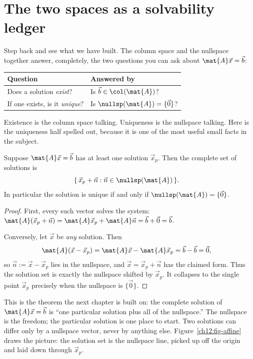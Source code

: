 \section{The two spaces as a solvability ledger}

Step back and see what we have built. The column space and the nullspace
together answer, completely, the two questions you can ask about
$\mat{A}\vec{x}=\vec{b}$:

\begin{center}
\begin{tabular}{ll}
\toprule
\textbf{Question} & \textbf{Answered by} \\
\midrule
Does a solution \emph{exist}? & Is $\vec{b}\in\col(\mat{A})$? \\
If one exists, is it \emph{unique}? & Is $\nullsp(\mat{A})=\{\vec 0\}$? \\
\bottomrule
\end{tabular}
\end{center}

Existence is the column space talking. Uniqueness is the nullspace talking. Here
is the uniqueness half spelled out, because it is one of the most useful small
facts in the subject.

\begin{theorem}\label{ch12:uniqueness}
Suppose $\mat{A}\vec{x}=\vec{b}$ has at least one solution $\vec{x}_p$. Then the
complete set of solutions is
\[
  \{\,\vec{x}_p + \vec{n} : \vec{n}\in\nullsp(\mat{A})\,\}.
\]
In particular the solution is unique if and only if $\nullsp(\mat{A})=\{\vec 0\}$.
\end{theorem}

\begin{proof}
First, every such vector solves the system: $\mat{A}(\vec{x}_p+\vec{n})
= \mat{A}\vec{x}_p + \mat{A}\vec{n} = \vec{b} + \vec{0} = \vec{b}$.

Conversely, let $\vec{x}$ be \emph{any} solution. Then
\[
  \mat{A}(\vec{x}-\vec{x}_p) = \mat{A}\vec{x} - \mat{A}\vec{x}_p
  = \vec{b}-\vec{b} = \vec{0},
\]
so $\vec{n} := \vec{x}-\vec{x}_p$ lies in the nullspace, and $\vec{x}
= \vec{x}_p + \vec{n}$ has the claimed form. Thus the solution set is exactly the
nullspace shifted by $\vec{x}_p$. It collapses to the single point $\vec{x}_p$
precisely when the nullspace is $\{\vec 0\}$. \qedhere
\end{proof}

This is the theorem the next chapter is built on: the complete solution of
$\mat{A}\vec{x}=\vec{b}$ is ``one particular solution plus all of the
nullspace.'' The nullspace is the freedom; the particular solution is one place
to start. Two solutions can differ only by a nullspace vector, never by anything
else. Figure~\ref{ch12:fig-affine} draws the picture: the solution set is the
nullspace line, picked up off the origin and laid down through $\vec{x}_p$.

